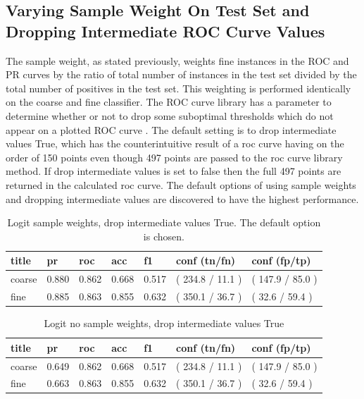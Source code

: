 \documentclass[ms]{nuthesis}
\begin{document}
\subsection{Varying Sample Weight On Test Set and Dropping Intermediate ROC Curve Values}
\par The sample weight, as stated previously, weights fine instances in the ROC and PR curves by the ratio of
total number of instances in the test set divided by the total number of positives in the test set. This
weighting is performed identically on the coarse and fine classifier. The ROC curve library has a parameter to determine
whether or not to drop some suboptimal thresholds which do not appear on a plotted ROC curve \cite{scikit-learn}. The
default setting is to drop intermediate values True, which has the counterintuitive result of a roc curve having on the order of
150 points even though 497 points are passed to the roc curve library method. If drop intermediate values is set to false
then the full 497 points are returned in the calculated roc curve. The default
options of using sample weights and dropping intermediate values are discovered to have the
highest performance.



\FloatBarrier
\begin{table}[H]
\centering
\caption{Logit sample weights, drop intermediate values True. The default option is chosen.}
\label{tab:LogRegDefSWDropFalse}
\begin{tabular}{|l||l||l||l||l||l||l|}\toprule
title & pr & roc & acc & f1 & conf (tn/fn) & conf (fp/tp) \\ \midrule
coarse & 0.880 & 0.862 & 0.668 & 0.517 & ( 234.8 / 11.1 ) & ( 147.9 / 85.0 ) \\
fine & 0.885 & 0.863 & 0.855 & 0.632 & ( 350.1 / 36.7 ) & ( 32.6 / 59.4 ) \\ \bottomrule
\end{tabular}
\end{table}
\FloatBarrier


\FloatBarrier
\begin{table}[h]
\centering
\caption{Logit no sample weights, drop intermediate values True}
\label{tab:LogReg-NoSW}
\begin{tabular}{|l||l||l||l||l||l||l|}\toprule
title & pr & roc & acc & f1 & conf (tn/fn) & conf (fp/tp) \\ \midrule
coarse & 0.649 & 0.862 & 0.668 & 0.517 & ( 234.8 / 11.1 ) & ( 147.9 / 85.0 ) \\
fine & 0.663 & 0.863 & 0.855 & 0.632 & ( 350.1 / 36.7 ) & ( 32.6 / 59.4 ) \\ \bottomrule
\end{tabular}
\end{table}
\FloatBarrier
\end{document}
